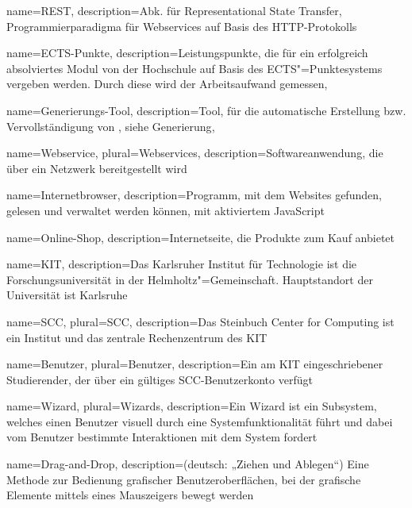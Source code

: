 %
%
%
%
{
	name=REST,
	description={Abk. für Representational State Transfer, Programmierparadigma für \glspl{Webservice} auf Basis des HTTP-Protokolls}
}

{
	name=ECTS-Punkte,
	description={Leistungspunkte, die für ein erfolgreich absolviertes \gls{Modul} von der Hochschule auf Basis des ECTS"=Punktesystems vergeben werden. Durch diese wird der Arbeitsaufwand gemessen},
}

{
	name=Generierungs-Tool,
	description={Tool, für die automatische Erstellung bzw. Vervollständigung von , siehe \gls{Generierung}},
}


{
	name=Webservice,
	plural=Webservices,
	description={Softwareanwendung, die über ein Netzwerk bereitgestellt wird}
}

{
	name={Internetbrowser},
	description={Programm, mit dem Websites gefunden, gelesen und verwaltet werden können, mit aktiviertem JavaScript}
}

{
	name={Online-Shop},
	description={Internetseite, die Produkte zum Kauf anbietet}
}

{
	name=KIT,
	description={Das Karlsruher Institut für Technologie ist die Forschungsuniversität in der Helmholtz"=Gemeinschaft. Hauptstandort der Universität ist Karlsruhe}
}

{
	name=SCC,
	plural=SCC,
	description={Das Steinbuch Center for Computing ist ein Institut und das zentrale Rechenzentrum des \gls{KIT}}
}

{
	name=Benutzer,
	plural=Benutzer,
	description={Ein am \gls{KIT} eingeschriebener Studierender, der über ein gültiges \gls{SCC}-Benutzerkonto verfügt}
}

{
	name=Wizard,
	plural=Wizards,
	description={Ein Wizard ist ein Subsystem, welches einen \gls{Benutzer} visuell durch eine Systemfunktionalität führt und dabei vom \gls{Benutzer} bestimmte Interaktionen mit dem System fordert}
}

{
	name=Drag-and-Drop,
	description={(deutsch: „Ziehen und Ablegen“) Eine Methode zur Bedienung grafischer Benutzeroberflächen, bei der grafische Elemente mittels eines Mauszeigers bewegt werden}
}

